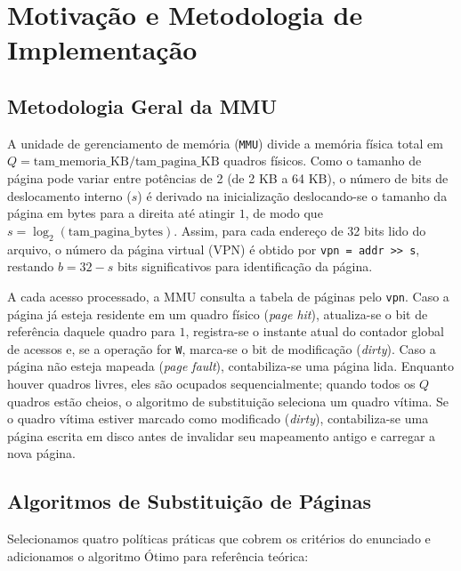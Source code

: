 \documentclass[12pt,a4paper]{article}
\begin{document}
\section{Motivação e Metodologia de Implementação}

\subsection{Metodologia Geral da MMU}

A unidade de gerenciamento de memória (\texttt{MMU}) divide a memória física total em $Q = \text{tam\_memoria\_KB} / \text{tam\_pagina\_KB}$ quadros físicos. Como o tamanho de página pode variar entre potências de 2 (de 2 KB a 64 KB), o número de bits de deslocamento interno ($s$) é derivado na inicialização deslocando-se o tamanho da página em bytes para a direita até atingir $1$, de modo que $s = \log_2(\text{tam\_pagina\_bytes})$. Assim, para cada endereço de 32 bits lido do arquivo, o número da página virtual (VPN) é obtido por \texttt{vpn = addr >> s}, restando $b = 32 - s$ bits significativos para identificação da página.

A cada acesso processado, a MMU consulta a tabela de páginas pelo \texttt{vpn}. Caso a página já esteja residente em um quadro físico (\textit{page hit}), atualiza-se o bit de referência daquele quadro para $1$, registra-se o instante atual do contador global de acessos e, se a operação for \texttt{W}, marca-se o bit de modificação (\textit{dirty}). Caso a página não esteja mapeada (\textit{page fault}), contabiliza-se uma página lida. Enquanto houver quadros livres, eles são ocupados sequencialmente; quando todos os $Q$ quadros estão cheios, o algoritmo de substituição seleciona um quadro vítima. Se o quadro vítima estiver marcado como modificado (\textit{dirty}), contabiliza-se uma página escrita em disco antes de invalidar seu mapeamento antigo e carregar a nova página.

\subsection{Algoritmos de Substituição de Páginas}

Selecionamos quatro políticas práticas que cobrem os critérios do enunciado e adicionamos o algoritmo Ótimo para referência teórica:
\end{document}
